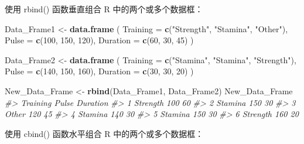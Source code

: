 \documentclass[
]{book}
\newenvironment{Shaded}{\begin{snugshade}}{\end{snugshade}}
\newcommand{\AttributeTok}[1]{\textcolor[rgb]{0.13,0.29,0.53}{#1}}
\newcommand{\CommentTok}[1]{\textcolor[rgb]{0.56,0.35,0.01}{\textit{#1}}}
\newcommand{\DecValTok}[1]{\textcolor[rgb]{0.00,0.00,0.81}{#1}}
\newcommand{\FunctionTok}[1]{\textcolor[rgb]{0.13,0.29,0.53}{\textbf{#1}}}
\newcommand{\NormalTok}[1]{#1}
\newcommand{\OtherTok}[1]{\textcolor[rgb]{0.56,0.35,0.01}{#1}}
\newcommand{\StringTok}[1]{\textcolor[rgb]{0.31,0.60,0.02}{#1}}
\begin{document}
使用 rbind() 函数垂直组合 R 中的两个或多个数据框：

\begin{Shaded}
\begin{Highlighting}[]
\NormalTok{Data\_Frame1 }\OtherTok{\textless{}{-}} \FunctionTok{data.frame}\NormalTok{ (}
  \AttributeTok{Training =} \FunctionTok{c}\NormalTok{(}\StringTok{"Strength"}\NormalTok{, }\StringTok{"Stamina"}\NormalTok{, }\StringTok{"Other"}\NormalTok{),}
  \AttributeTok{Pulse =} \FunctionTok{c}\NormalTok{(}\DecValTok{100}\NormalTok{, }\DecValTok{150}\NormalTok{, }\DecValTok{120}\NormalTok{),}
  \AttributeTok{Duration =} \FunctionTok{c}\NormalTok{(}\DecValTok{60}\NormalTok{, }\DecValTok{30}\NormalTok{, }\DecValTok{45}\NormalTok{)}
\NormalTok{)}

\NormalTok{Data\_Frame2 }\OtherTok{\textless{}{-}} \FunctionTok{data.frame}\NormalTok{ (}
  \AttributeTok{Training =} \FunctionTok{c}\NormalTok{(}\StringTok{"Stamina"}\NormalTok{, }\StringTok{"Stamina"}\NormalTok{, }\StringTok{"Strength"}\NormalTok{),}
  \AttributeTok{Pulse =} \FunctionTok{c}\NormalTok{(}\DecValTok{140}\NormalTok{, }\DecValTok{150}\NormalTok{, }\DecValTok{160}\NormalTok{),}
  \AttributeTok{Duration =} \FunctionTok{c}\NormalTok{(}\DecValTok{30}\NormalTok{, }\DecValTok{30}\NormalTok{, }\DecValTok{20}\NormalTok{)}
\NormalTok{)}

\NormalTok{New\_Data\_Frame }\OtherTok{\textless{}{-}} \FunctionTok{rbind}\NormalTok{(Data\_Frame1, Data\_Frame2)}
\NormalTok{New\_Data\_Frame}
\CommentTok{\#\textgreater{}   Training Pulse Duration}
\CommentTok{\#\textgreater{} 1 Strength   100       60}
\CommentTok{\#\textgreater{} 2  Stamina   150       30}
\CommentTok{\#\textgreater{} 3    Other   120       45}
\CommentTok{\#\textgreater{} 4  Stamina   140       30}
\CommentTok{\#\textgreater{} 5  Stamina   150       30}
\CommentTok{\#\textgreater{} 6 Strength   160       20}
\end{Highlighting}
\end{Shaded}

使用 cbind() 函数水平组合 R 中的两个或多个数据框：
\end{document}
